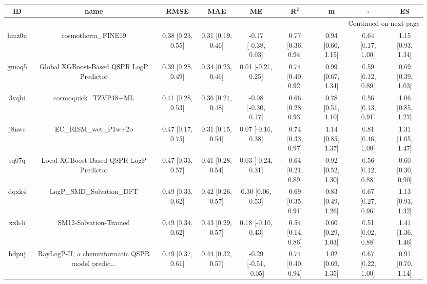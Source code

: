 \documentclass{article}
\begin{document}
\begin{center}
\scriptsize
\begin{longtable}{|ccccccccc|}
\toprule
    ID &                                               name &               RMSE &                MAE &                    ME &              R$^2$ &                    m &               $\tau$ &                    ES \\
\midrule
\endhead
\midrule
\multicolumn{9}{r}{{Continued on next page}} \\
\midrule
\endfoot

\bottomrule
\endlastfoot
 hmz0n &                                 cosmotherm\_FINE19 &  0.38 [0.23, 0.55] &  0.31 [0.19, 0.46] &   -0.17 [-0.38, 0.03] &  0.77 [0.36, 0.94] &    0.94 [0.60, 1.15] &    0.64 [0.17, 1.00] &     1.15 [0.93, 1.34] \\
 gmoq5 &           Global XGBoost-Based QSPR LogP Predictor &  0.39 [0.28, 0.49] &  0.34 [0.23, 0.46] &    0.01 [-0.21, 0.25] &  0.74 [0.40, 0.92] &    0.99 [0.67, 1.34] &    0.59 [0.12, 0.89] &     0.69 [0.39, 1.03] \\
 3vqbi &                              cosmoquick\_TZVP18+ML &  0.41 [0.28, 0.53] &  0.36 [0.24, 0.48] &   -0.08 [-0.30, 0.17] &  0.66 [0.28, 0.93] &    0.78 [0.51, 1.10] &    0.56 [0.13, 0.91] &     1.06 [0.85, 1.27] \\
 j8nwc &                              EC\_RISM\_wet\_P1w+2o &  0.47 [0.17, 0.75] &  0.31 [0.15, 0.54] &    0.07 [-0.16, 0.38] &  0.74 [0.33, 0.97] &    1.14 [0.85, 1.37] &    0.81 [0.46, 1.00] &     1.31 [1.05, 1.47] \\
 sq07q &            Local XGBoost-Based QSPR LogP Predictor &  0.47 [0.33, 0.57] &  0.41 [0.28, 0.54] &    0.03 [-0.24, 0.31] &  0.64 [0.21, 0.89] &    0.92 [0.52, 1.30] &    0.56 [0.12, 0.88] &     0.60 [0.30, 0.90] \\
 dqxk4 &                          LogP\_SMD\_Solvation\_DFT &  0.49 [0.33, 0.62] &  0.42 [0.26, 0.57] &     0.30 [0.06, 0.53] &  0.69 [0.35, 0.91] &    0.83 [0.49, 1.26] &    0.67 [0.27, 0.96] &     1.13 [0.93, 1.32] \\
 xxh4i &                             SM12-Solvation-Trained &  0.49 [0.34, 0.62] &  0.43 [0.29, 0.57] &    0.18 [-0.10, 0.43] &  0.54 [0.14, 0.86] &    0.60 [0.29, 1.03] &    0.51 [0.02, 0.88] &     1.41 [1.36, 1.46] \\
 hdpuj &  RayLogP-II, a cheminformatic QSPR model predic... &  0.49 [0.37, 0.61] &  0.44 [0.32, 0.57] &  -0.29 [-0.51, -0.05] &  0.74 [0.40, 0.94] &    1.02 [0.69, 1.35] &    0.67 [0.22, 1.00] &     0.91 [0.70, 1.14] \\

\end{longtable}
\end{center}
\end{document}
